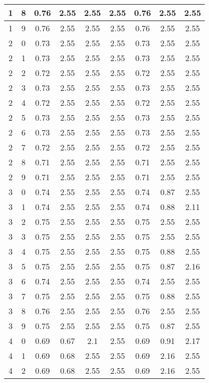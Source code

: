 \begin{longtable}{|c|c||c||c|c|c||c|c|c|}
	1 & 8 & 0.76 & 2.55 & 2.55 & 2.55 & 0.76 & 2.55 & 2.55 \\ \hline
	1 & 9 & 0.76 & 2.55 & 2.55 & 2.55 & 0.76 & 2.55 & 2.55 \\ \hline
	2 & 0 & 0.73 & 2.55 & 2.55 & 2.55 & 0.73 & 2.55 & 2.55 \\ \hline
	2 & 1 & 0.73 & 2.55 & 2.55 & 2.55 & 0.73 & 2.55 & 2.55 \\ \hline
	2 & 2 & 0.72 & 2.55 & 2.55 & 2.55 & 0.72 & 2.55 & 2.55 \\ \hline
	2 & 3 & 0.73 & 2.55 & 2.55 & 2.55 & 0.73 & 2.55 & 2.55 \\ \hline
	2 & 4 & 0.72 & 2.55 & 2.55 & 2.55 & 0.72 & 2.55 & 2.55 \\ \hline
	2 & 5 & 0.73 & 2.55 & 2.55 & 2.55 & 0.73 & 2.55 & 2.55 \\ \hline
	2 & 6 & 0.73 & 2.55 & 2.55 & 2.55 & 0.73 & 2.55 & 2.55 \\ \hline
	2 & 7 & 0.72 & 2.55 & 2.55 & 2.55 & 0.72 & 2.55 & 2.55 \\ \hline
	2 & 8 & 0.71 & 2.55 & 2.55 & 2.55 & 0.71 & 2.55 & 2.55 \\ \hline
	2 & 9 & 0.71 & 2.55 & 2.55 & 2.55 & 0.71 & 2.55 & 2.55 \\ \hline
	3 & 0 & 0.74 & 2.55 & 2.55 & 2.55 & 0.74 & 0.87 & 2.55 \\ \hline
	3 & 1 & 0.74 & 2.55 & 2.55 & 2.55 & 0.74 & 0.88 & 2.11 \\ \hline
	3 & 2 & 0.75 & 2.55 & 2.55 & 2.55 & 0.75 & 2.55 & 2.55 \\ \hline
	3 & 3 & 0.75 & 2.55 & 2.55 & 2.55 & 0.75 & 2.55 & 2.55 \\ \hline
	3 & 4 & 0.75 & 2.55 & 2.55 & 2.55 & 0.75 & 0.88 & 2.55 \\ \hline
	3 & 5 & 0.75 & 2.55 & 2.55 & 2.55 & 0.75 & 0.87 & 2.16 \\ \hline
	3 & 6 & 0.74 & 2.55 & 2.55 & 2.55 & 0.74 & 2.55 & 2.55 \\ \hline
	3 & 7 & 0.75 & 2.55 & 2.55 & 2.55 & 0.75 & 0.88 & 2.55 \\ \hline
	3 & 8 & 0.76 & 2.55 & 2.55 & 2.55 & 0.76 & 2.55 & 2.55 \\ \hline
	3 & 9 & 0.75 & 2.55 & 2.55 & 2.55 & 0.75 & 0.87 & 2.55 \\ \hline
	4 & 0 & 0.69 & 0.67 & 2.1 & 2.55 & 0.69 & 0.91 & 2.17 \\ \hline
	4 & 1 & 0.69 & 0.68 & 2.55 & 2.55 & 0.69 & 2.16 & 2.55 \\ \hline
	4 & 2 & 0.69 & 0.68 & 2.55 & 2.55 & 0.69 & 2.16 & 2.55 \\ \hline

\end{longtable}
